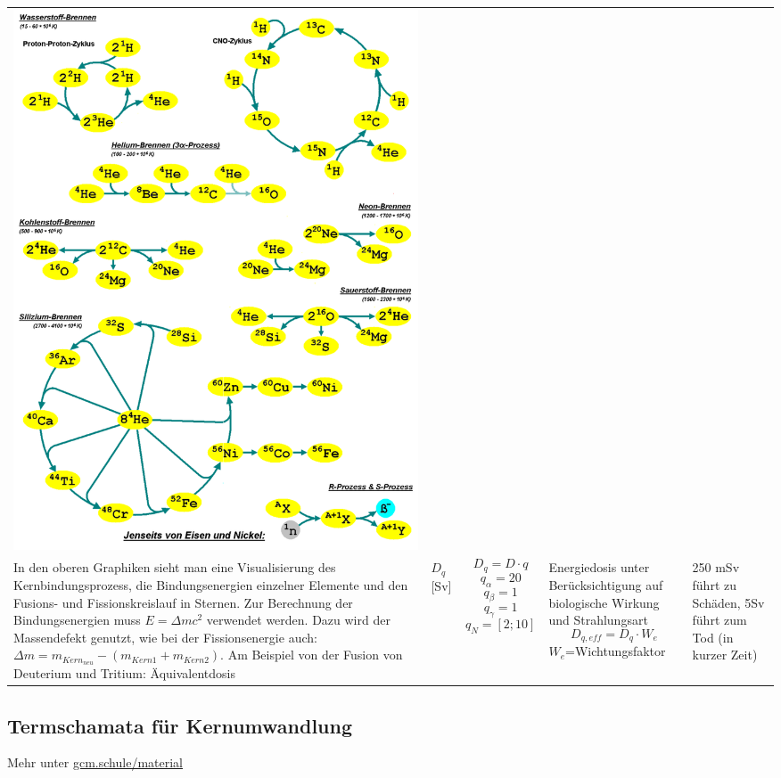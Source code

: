 \documentclass{article}
\begin{document}
\begin{tabular}{ |p{4cm}|p{1cm}|p{3cm}|p{4cm}|p{4cm}|  }
	    			\includegraphics[width=1\textwidth]{graphics/sternzyklus.png} \\
	    			In den oberen Graphiken sieht man eine Visualisierung des Kernbindungsprozess, die Bindungsenergien einzelner Elemente und
	    			den Fusions- und Fissionskreislauf in Sternen. Zur Berechnung der Bindungsenergien muss $ E=\Delta mc^2 $ verwendet werden.
	    			Dazu wird der Massendefekt genutzt, wie bei der Fissionsenergie auch: $\Delta m = m_{Kern_{neu}} - (m_{Kern1} + m_{Kern2})$.
	    			Am Beispiel von der Fusion von Deuterium und Tritium:      Äquivalentdosis & $D_q$[Sv]& \[ D_q = D \cdot q \] \[q_{\alpha}=20\] \[q_{\beta}=1\]\[q_{\gamma}=1\] \[q_{N}=[2;10]\] & Energiedosis unter Berücksichtigung auf biologische Wirkung und Strahlungsart \[D_{q,eff}=D_q \cdot W_e\] $W_e$=Wichtungsfaktor & 250 mSv führt zu Schäden, 5Sv führt zum Tod (in kurzer Zeit) \\
	    			\hline
	    		\end{tabular}
    	
    	\subsection{Termschamata für Kernumwandlung}

        Mehr unter \href{https://gcm.schule/material/2024/physik/lk13/}{gcm.schule/material}

      
\end{document}
